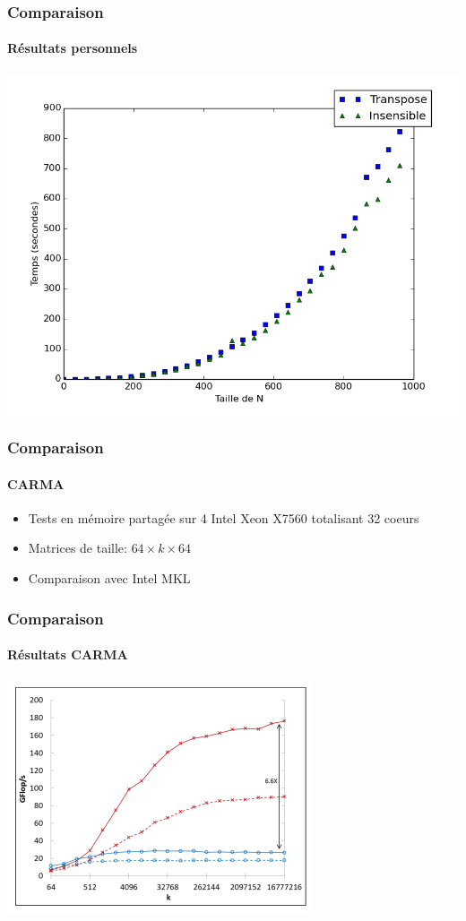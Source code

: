 \documentclass{beamer}
\begin{document}
\begin{frame}
\frametitle{Comparaison}
\framesubtitle{Résultats personnels}
\begin{center}
\colorbox{white}{\includegraphics[scale=0.4]{matmult.png}}
\end{center}
\end{frame}

\begin{frame}
\frametitle{Comparaison}
\framesubtitle{CARMA}
\begin{itemize}
\item Tests en mémoire partagée sur 4 Intel Xeon X7560 totalisant 32 coeurs
\item Matrices de taille: $64 \times k \times 64$
\item Comparaison avec Intel MKL
\end{itemize}
\end{frame}

\begin{frame}
\frametitle{Comparaison}
\framesubtitle{Résultats CARMA}
\begin{center}
\colorbox{white}{\includegraphics[scale=0.9]{CARMA.png}}
\end{center}
\end{frame}
\end{document}
